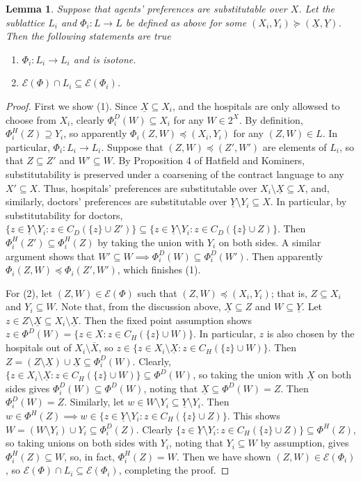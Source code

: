 \documentclass[11pt,reqno]{amsart}
\newtheorem{lemma}[thm]{Lemma}
\theoremstyle{definition}
\numberwithin{equation}{section}
\newcommand{\prf}{\begin{proof}}
\newcommand{\eprf}{\end{proof}}
\newcommand{\lft}{\left(}
\newcommand{\rt}{\right)}
\newcommand{\ol}{\overline}
\newcommand{\ul}{\underline}
\newcommand{\sub}{\subseteq}
\newcommand{\fix}{\mathcal{E}}
\newcommand{\suq}{\succeq}
\newcommand{\peq}{\preceq}
\newcommand{\lattice}{L}
\newcommand{\topx}{\ol{X}}
\newcommand{\botx}{\ul{X}}
\newcommand{\boty}{\ul{Y}}
\begin{document}
\begin{lemma} \label{lemma:phigar}
Suppose that agents' preferences are substitutable over $X$.
Let the sublattice $\lattice_i$ and $\Phi_i: \lattice \to \lattice$ be defined as above for some $(X_i, Y_i) \suq (\botx, \boty)$. 
Then the following statements are true
\begin{enumerate}
\item $\Phi_i: \lattice_i \to \lattice_i$ and is isotone. 
\item$\fix(\Phi) \cap \lattice_i \sub \fix(\Phi_i)$.
\end{enumerate}
\end{lemma}
\prf 
First we show (1). 
Since $\botx \sub X_i$, and the hospitals are only allowsed to choose from $X_i$, clearly $\Phi^D_i(W) \sub X_i$ for any $W \in 2^X$.
By definition, $\Phi^H_i(Z) \supseteq Y_i$, so apparently $\Phi_i(Z,W) \peq (X_i, Y_i)$ for any $(Z,W) \in \lattice$. 
In particular, $\Phi_i: \lattice_i \to \lattice_i$.
Suppose that $(Z,W) \peq (Z',W')$ are elements of $\lattice_i$, so that $Z \sub Z'$ and $W' \sub W$.
By Proposition 4 of Hatfield and Kominers, substitutability is preserved under a coarsening of the contract language to any $X' \sub X$.
Thus, hospitals' preferences are substitutable over $X_i \setminus \botx \sub X$, and, similarly, doctors' preferences are substitutable over $\boty \setminus Y_i \sub X$.
In particular, by substitutability for doctors, $\{z \in \boty \setminus Y_i: z \in C_D( \{z \} \cup Z') \} \sub \{z \in \boty \setminus Y_i: z \in C_D( \{z \} \cup Z) \}$. 
Then $\Phi_i^H(Z') \sub \Phi_i^H(Z)$ by taking the union with $Y_i$ on both sides.
A similar argument shows that $W' \sub W \implies \Phi^D_i(W) \sub \Phi^D_i(W')$.
Then apparently $\Phi_i(Z,W) \peq \Phi_i(Z',W')$, which finishes (1).

For (2), let $(Z,W) \in \fix(\Phi)$ such that $(Z,W) \peq (X_i,Y_i)$; that is, $Z \sub X_i$ and $Y_i \sub W$.
Note that, from the discussion above, $\botx \sub Z$ and $W \sub \boty$.
Let $z \in Z \setminus \botx \sub X_i \setminus \botx$.
Then the fixed point assumption shows $z \in \Phi^D(W) = \{z \in X: z \in C_H( \{z \} \cup W) \}$. 
In particular, $z$ is also chosen by the hospitals out of $X_i \setminus \topx$, so $z \in \{z \in X_i \setminus \botx: z \in C_H( \{z \} \cup W) \}$. 
Then $Z = \lft Z \setminus \botx \rt \cup \botx \sub \Phi_i^D(W)$. 
Clearly, $\{z \in X_i \setminus \botx: z \in C_H( \{z \} \cup W) \} \sub \Phi^D(W)$, so taking the union with $\botx$ on both sides gives $\Phi_i^D(W) \sub \Phi^D(W)$, noting that $\botx \sub \Phi^D(W) = Z$. 
Then $\Phi_i^D(W) = Z$.
Similarly, let $w \in W \setminus Y_i \sub \boty \setminus Y_i$. 
Then $w \in \Phi^H(Z) \implies w \in \{z \in \boty \setminus Y_i: z \in C_H( \{z \} \cup Z) \}$. 
This shows $W = \lft W \setminus Y_i \rt \cup Y_i \sub \Phi^D_i(Z)$.
Clearly $\{z \in \boty \setminus Y_i: z \in C_H( \{z \} \cup Z) \} \sub \Phi^H(Z)$, so taking unions on both sides with $Y_i$, noting that $Y_i \sub W$ by assumption, gives $\Phi^H_i(Z) \sub W$, so, in fact, $\Phi^H_i(Z) = W$.
Then we have shown $(Z,W) \in \fix(\Phi_i)$, so $\fix(\Phi) \cap \lattice_i \sub \fix(\Phi_i)$, completing the proof.
\eprf
\end{document}
